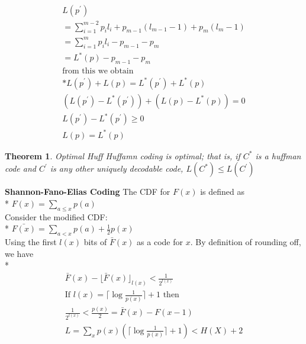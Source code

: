 \documentclass[10pt]{article}
\newtheorem{thm}{Theorem}[section]
\begin{document}
\begin{tiny}
\begin{multicols}{3}
\begin{eqnarray}
L(p^{'}) \\
= \sum_{i=1}^{m-2} p_i l_i + p_{m-1}(l_{m-1} -1 )+p_{m}(l_{m} -1)\\
=\sum_{i=1}^{m} {p_i}{l_i} - {p_{m-1}} - {p_{m}}\\
=L^{*}(p) - {p_{m-1}} - {p_{m}}\\
\text{from this we obtain} \\*
L(p^{'}) + L(p) = L^{*}(p^{'}) + L^{*}(p)\\
(L(p^{'}) -  L^{*}(p^{'})) + (L(p) - L^{*}(p)) = 0\\
L(p^{'}) - L^{*}(p^{'}) \geq 0 \\
L(p) = L^{*}(p)
\end{eqnarray}
\begin{thm}{Optimal Huff} \label{thm: opthuff}
Huffamn coding is optimal; that is, if $C^{*}$ is a huffman code and $C^{'}$ is any other uniquely decodable code,
$L(C^{*}) \leq L(C^{'})$
\end{thm}


\textbf{\scriptsize Shannon-Fano-Elias Coding}
The CDF for ${F(x)}$ is defined as \\* $F(x) = \sum_{a\leq x}p(a)$\\
Consider the modified CDF: \\* $\bar{ F(x)} = \sum_{a < x}p(a) + \frac{1}{2} p(x)$\\
Using the first $l(x)$ bits of $\bar{F}(x)$ as a code for $x$. By definition of rounding off, we have \\*
\begin{eqnarray}
\bar{F}(x) - {\lfloor \bar{F}(x) \rfloor}_{l(x)} < \frac{1}{2^{l(x)}}\\
\text{If } l(x) = \lceil \log \frac{1}{p(x)} \rceil + 1 \text{ then } \\
\frac {1}{2^{l(x)}} < \frac {p(x)}{2} =  \bar{F}(x) - F(x-1)\\
L= \sum_x p(x) (\lceil \log \frac {1}{p(x)} \rceil + 1) < H(X) + 2
\end{eqnarray}


\end{multicols}
\end{tiny}
\end{document}
